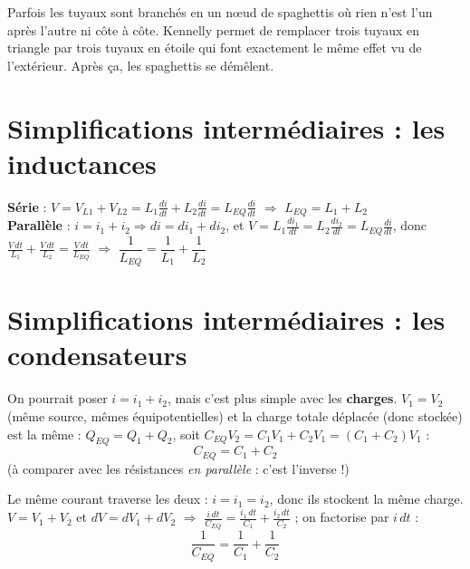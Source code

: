 \begin{goatbox}
Parfois les tuyaux sont branchés en un nœud de spaghettis où rien n'est \og l'un après
l'autre\fg{} ni \og côte à côte\fg{}. Kennelly permet de remplacer trois tuyaux en triangle
par trois tuyaux en étoile qui font exactement le même effet vu de l'extérieur. Après ça, les
spaghettis se démêlent.
\end{goatbox}

\section{Simplifications intermédiaires : les inductances}


\begin{thmbox}[title=Inductances en série et en parallèle]
\textbf{Série} : $V = V_{L1} + V_{L2} = L_1\frac{di}{dt} + L_2\frac{di}{dt} = L_{EQ}\frac{di}{dt}$
$\Rightarrow$ $\boxed{L_{EQ} = L_1 + L_2}$ \\[4pt]
\textbf{Parallèle} : $i = i_1 + i_2 \Rightarrow di = di_1 + di_2$, et
$V = L_1\frac{di_1}{dt} = L_2\frac{di_2}{dt} = L_{EQ}\frac{di}{dt}$, donc
$\frac{V\,dt}{L_1} + \frac{V\,dt}{L_2} = \frac{V\,dt}{L_{EQ}}$ $\Rightarrow$
$\boxed{\dfrac1{L_{EQ}} = \dfrac1{L_1} + \dfrac1{L_2}}$
\end{thmbox}

\section{Simplifications intermédiaires : les condensateurs}


\begin{thmbox}[title=Condensateurs en parallèle]
On pourrait poser $i = i_1 + i_2$, mais c'est plus simple avec les \textbf{charges}.
$V_1 = V_2$ (même source, mêmes équipotentielles) et la charge totale déplacée (donc
stockée) est la même : $Q_{EQ} = Q_1 + Q_2$, soit
$C_{EQ} V_2 = C_1 V_1 + C_2 V_1 = (C_1 + C_2)V_1$ :
\[ C_{EQ} = C_1 + C_2 \]
(à comparer avec les résistances \emph{en parallèle} : c'est l'inverse !)
\end{thmbox}


\begin{thmbox}[title=Condensateurs en série]
Le même courant traverse les deux : $i = i_1 = i_2$, donc ils stockent la même charge.
$V = V_1 + V_2$ et $dV = dV_1 + dV_2$ $\Rightarrow$
$\frac{i\,dt}{C_{EQ}} = \frac{i_1\,dt}{C_1} + \frac{i_2\,dt}{C_2}$ ; on factorise par $i\,dt$ :
\[ \frac1{C_{EQ}} = \frac1{C_1} + \frac1{C_2} \]
\end{thmbox}

